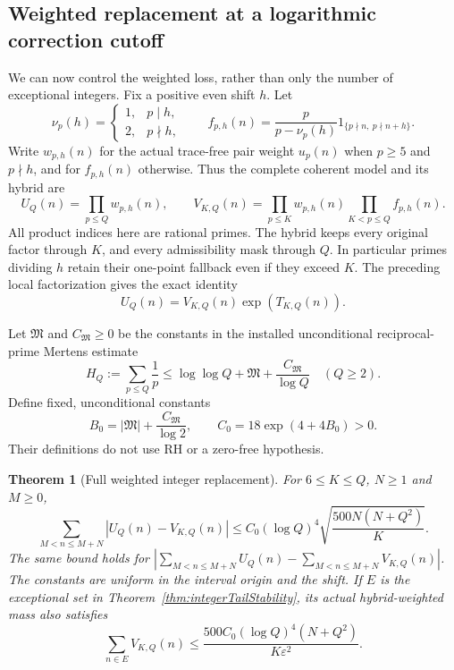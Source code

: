 \documentclass[11pt]{article}
\newtheorem{theorem}{Theorem}[section]
\begin{document}
\subsection{Weighted replacement at a logarithmic correction cutoff}
\label{sec:integerWeightedReplacement}

We can now control the weighted loss, rather than only the number
of exceptional integers. Fix a positive even shift \(h\). Let
\[
 \nu_p(h)=\begin{cases}1,&p\mid h,\\2,&p\nmid h,\end{cases}
 \qquad
 f_{p,h}(n)=\frac{p}{p-\nu_p(h)}
          1_{\{p\nmid n,\ p\nmid n+h\}}.
\]
Write \(w_{p,h}(n)\) for the actual trace-free pair weight \(u_p(n)\)
when \(p\geq5\) and \(p\nmid h\), and for \(f_{p,h}(n)\) otherwise.
Thus the complete coherent model and its hybrid are
\[
 U_Q(n)=\prod_{p\leq Q}w_{p,h}(n),\qquad
 V_{K,Q}(n)=\prod_{p\leq K}w_{p,h}(n)
                    \prod_{K<p\leq Q}f_{p,h}(n).
\]
All product indices here are rational primes. The hybrid keeps every
original factor through \(K\), and every admissibility mask through
\(Q\). In particular primes dividing \(h\) retain their one-point
fallback even if they exceed \(K\). The preceding local factorization
gives the exact identity
\[
                         U_Q(n)=V_{K,Q}(n)\exp(T_{K,Q}(n)).
\]

Let \(\mathfrak M\) and \(C_{\mathfrak M}\geq0\) be the constants in
the installed unconditional reciprocal-prime Mertens estimate
\[
 H_Q:=\sum_{p\leq Q}\frac1p
 \leq\log\log Q+\mathfrak M+\frac{C_{\mathfrak M}}{\log Q}
 \quad(Q\geq2).
\]
Define fixed, unconditional constants
\[
 B_0=|\mathfrak M|+\frac{C_{\mathfrak M}}{\log2},
 \qquad C_0=18\exp(4+4B_0)>0.
\]
Their definitions do not use RH or a zero-free hypothesis.

\begin{theorem}[Full weighted integer replacement]
\label{thm:integerWeightedReplacement}
For \(6\leq K\leq Q\), \(N\geq1\) and \(M\geq0\),
\[
 \sum_{M<n\leq M+N}|U_Q(n)-V_{K,Q}(n)|
 \leq C_0(\log Q)^4
                    \sqrt{\frac{500N(N+Q^2)}K}.
\]
The same bound holds for
\(\left|\sum_{M<n\leq M+N}U_Q(n)-\sum_{M<n\leq M+N}V_{K,Q}(n)\right|\).
The constants are uniform in the interval origin and the shift.
If \(E\) is the exceptional set in
Theorem~\ref{thm:integerTailStability}, its actual hybrid-weighted mass
also satisfies
\[
 \sum_{n\in E}V_{K,Q}(n)
 \leq\frac{500C_0(\log Q)^4(N+Q^2)}{K\varepsilon^2}.
\]
\end{theorem}
\end{document}
